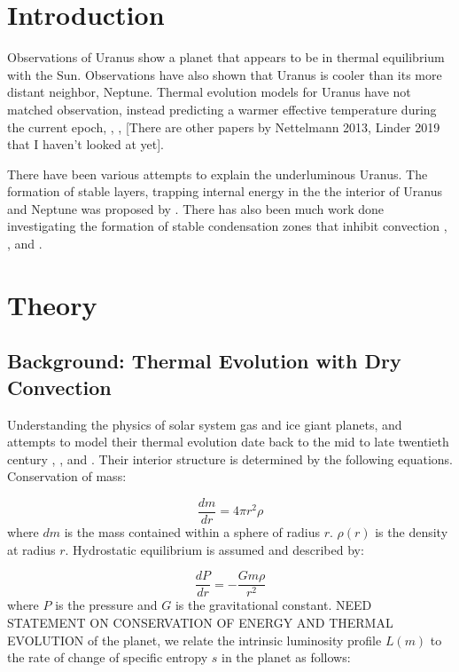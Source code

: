 \documentclass[11pt]{ucscthesisbs}
\begin{document}
\chapter{Introduction}
Observations of Uranus show a planet that appears to be in thermal equilibrium with the Sun. Observations have also shown that Uranus is cooler than its more distant neighbor, Neptune. Thermal evolution models for Uranus have not matched observation, instead predicting a warmer effective temperature during the current epoch\citep{fortney_2011}, \citep{podolak_1991}, \citep{hubbard_1995}, \citep{scheibe_2019} [There are other papers by Nettelmann 2013, Linder 2019 that I haven't looked at yet]. 

There have been various attempts to explain the underluminous Uranus. The formation of stable layers, trapping internal energy in the the interior of Uranus and Neptune was proposed by \citep{podolak_1991}. There has also been much work done investigating the formation of stable condensation zones that inhibit convection \citep{friedson_2017}, \citep{leconte_2017}, and \citep{guillot_1995}. 


\chapter{Theory}

\section{Background: Thermal Evolution with Dry Convection}
Understanding the physics of solar system gas and ice giant planets, and attempts to model their thermal evolution date back to the mid to late twentieth century \citep{hubbard_1977}, \citep{hubbard_1977_2}, and \citep{podolak_1991}. Their interior structure is determined by the following equations. Conservation of mass:

\begin{equation}
  \frac{dm}{dr} =4 \pi r^{2}\rho  
\end{equation}
where $dm$ is the mass contained within a sphere of radius $r$. $\rho(r)$ is the density at radius $r$. Hydrostatic equilibrium is assumed and described by:

\begin{equation}
  \frac{dP}{dr} = -\frac{Gm\rho}{r^{2}}  
\end{equation}
where $P$ is the pressure and $G$ is the gravitational constant. NEED STATEMENT ON CONSERVATION OF ENERGY AND THERMAL EVOLUTION of the planet, we relate the intrinsic luminosity profile $L(m)$ to the rate of change of specific entropy $s$ in the planet as follows:
\end{document}
